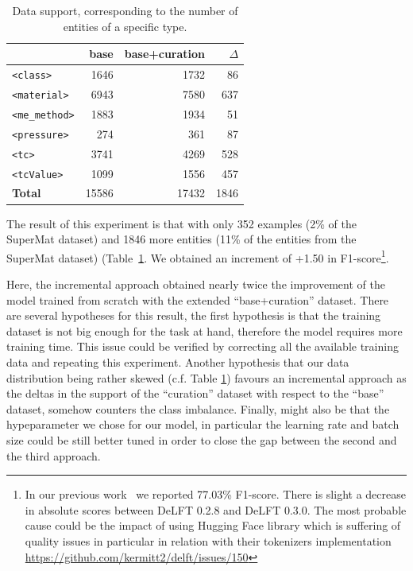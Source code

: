 \documentclass[a4paper]{article}
\begin{document}
\begin{table}[ht]
\centering
\begin{tabular}{lrrr}
\toprule
                        & \textbf{base}     & \textbf{base+curation}    & \textbf{$\Delta$}  \\ 
\midrule
\texttt{<class>}        & 1646              & 1732                      &  86                \\
\texttt{<material>}     & 6943              & 7580                      &  637               \\
\texttt{<me\_method>}   & 1883              & 1934                      &  51                \\
\texttt{<pressure>}     & 274               & 361                       &  87                \\
\texttt{<tc>}           & 3741              & 4269                      &  528               \\
\texttt{<tcValue>}      & 1099              & 1556                      &  457               \\
\midrule
\textbf{Total}          & 15586             & 17432                     & 1846               \\ 
\bottomrule
\end{tabular}
\caption{Data support, corresponding to the number of entities of a specific type.}
\label{tab:training-support}
\end{table}

The result of this experiment is that with only 352 examples (2\% of the SuperMat dataset) and 1846 more entities (11\% of the entities from the SuperMat dataset) (Table~\ref{tab:training-support}. 
We obtained an increment of +1.50 in F1-score\footnote{In our previous work~\cite{lfoppiano2023automatic} we reported 77.03\% F1-score. There is slight a decrease in absolute scores between DeLFT 0.2.8 and DeLFT 0.3.0. The most probable cause could be the impact of using Hugging Face library which is suffering of quality issues in particular in relation with their tokenizers implementation \url{https://github.com/kermitt2/delft/issues/150}}.

Here, the incremental approach obtained nearly twice the improvement of the model trained from scratch with the extended ``base+curation'' dataset. 
There are several hypotheses for this result, the first hypothesis is that the training dataset is not big enough for the task at hand, therefore the model requires more training time. 
This issue could be verified by correcting all the available training data and repeating this experiment. 
Another hypothesis that our data distribution being rather skewed (c.f. Table \ref{tab:training-support}) favours an incremental approach as the deltas in the support of the ``curation'' dataset with respect to the ``base'' dataset,  somehow counters the class imbalance. 
Finally, might also be that the hypeparameter we chose for our model, in particular the learning rate and batch size could be still better tuned in order to close the gap between the second and the third approach.
\end{document}
